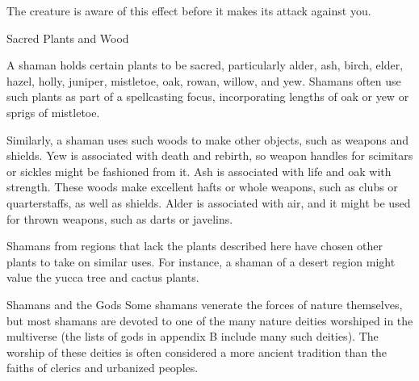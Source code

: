The creature is aware of this effect before it makes its attack against you.

\begin{DndComment}{Sacred Plants and Wood}

A shaman holds certain plants to be sacred, particularly alder, ash, birch, elder, hazel, holly, juniper, mistletoe, oak, rowan, willow, and yew. Shamans often use such plants as part of a spellcasting focus, incorporating lengths of oak or yew or sprigs of mistletoe.

 Similarly, a shaman uses such woods to make other objects, such as weapons and shields. Yew is associated with death and rebirth, so weapon handles for scimitars or sickles might be fashioned from it. Ash is associated with life and oak with strength. These woods make excellent hafts or whole weapons, such as clubs or quarterstaffs, as well as shields. Alder is associated with air, and it might be used for thrown weapons, such as darts or javelins.

 Shamans from regions that lack the plants described here have chosen other plants to take on similar uses. For instance, a shaman of a desert region might value the yucca tree and cactus plants.
\end{DndComment}

\begin{DndComment}{Shamans and the Gods}
 Some shamans venerate the forces of nature themselves, but most shamans are devoted to one of the many nature deities worshiped in the multiverse (the lists of gods in appendix B include many such deities). The worship of these deities is often considered a more ancient tradition than the faiths of clerics and urbanized peoples.
\end{DndComment}